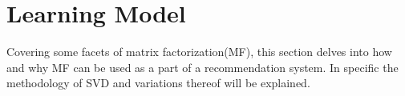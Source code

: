 \section{Learning Model}
Covering some facets of matrix factorization(MF), this section delves into how and why MF can be used as a part of a recommendation system. In specific the methodology of SVD and variations thereof will be explained. 
%
%



